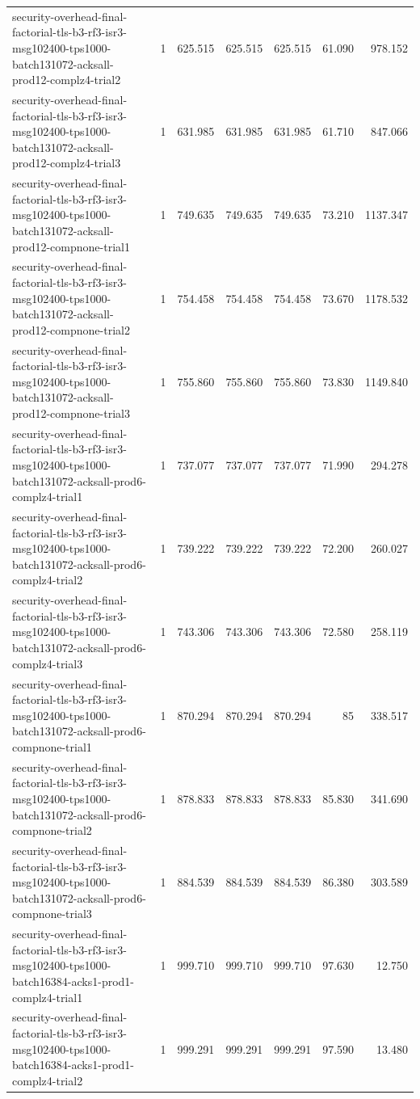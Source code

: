\begin{tabular}{lrrrrrr}
security-overhead-final-factorial-tls-b3-rf3-isr3-msg102400-tps1000-batch131072-acksall-prod12-complz4-trial2 & 1 & 625.515 & 625.515 & 625.515 & 61.090 & 978.152 \\
security-overhead-final-factorial-tls-b3-rf3-isr3-msg102400-tps1000-batch131072-acksall-prod12-complz4-trial3 & 1 & 631.985 & 631.985 & 631.985 & 61.710 & 847.066 \\
security-overhead-final-factorial-tls-b3-rf3-isr3-msg102400-tps1000-batch131072-acksall-prod12-compnone-trial1 & 1 & 749.635 & 749.635 & 749.635 & 73.210 & 1137.347 \\
security-overhead-final-factorial-tls-b3-rf3-isr3-msg102400-tps1000-batch131072-acksall-prod12-compnone-trial2 & 1 & 754.458 & 754.458 & 754.458 & 73.670 & 1178.532 \\
security-overhead-final-factorial-tls-b3-rf3-isr3-msg102400-tps1000-batch131072-acksall-prod12-compnone-trial3 & 1 & 755.860 & 755.860 & 755.860 & 73.830 & 1149.840 \\
security-overhead-final-factorial-tls-b3-rf3-isr3-msg102400-tps1000-batch131072-acksall-prod6-complz4-trial1 & 1 & 737.077 & 737.077 & 737.077 & 71.990 & 294.278 \\
security-overhead-final-factorial-tls-b3-rf3-isr3-msg102400-tps1000-batch131072-acksall-prod6-complz4-trial2 & 1 & 739.222 & 739.222 & 739.222 & 72.200 & 260.027 \\
security-overhead-final-factorial-tls-b3-rf3-isr3-msg102400-tps1000-batch131072-acksall-prod6-complz4-trial3 & 1 & 743.306 & 743.306 & 743.306 & 72.580 & 258.119 \\
security-overhead-final-factorial-tls-b3-rf3-isr3-msg102400-tps1000-batch131072-acksall-prod6-compnone-trial1 & 1 & 870.294 & 870.294 & 870.294 & 85 & 338.517 \\
security-overhead-final-factorial-tls-b3-rf3-isr3-msg102400-tps1000-batch131072-acksall-prod6-compnone-trial2 & 1 & 878.833 & 878.833 & 878.833 & 85.830 & 341.690 \\
security-overhead-final-factorial-tls-b3-rf3-isr3-msg102400-tps1000-batch131072-acksall-prod6-compnone-trial3 & 1 & 884.539 & 884.539 & 884.539 & 86.380 & 303.589 \\
security-overhead-final-factorial-tls-b3-rf3-isr3-msg102400-tps1000-batch16384-acks1-prod1-complz4-trial1 & 1 & 999.710 & 999.710 & 999.710 & 97.630 & 12.750 \\
security-overhead-final-factorial-tls-b3-rf3-isr3-msg102400-tps1000-batch16384-acks1-prod1-complz4-trial2 & 1 & 999.291 & 999.291 & 999.291 & 97.590 & 13.480 \\

\end{tabular}
